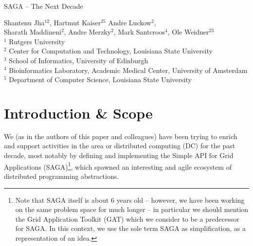 \documentclass{article}
\newcommand{\I}[1]{\textit{#1}}
\begin{document}
\begin{center}
 {\Large SAGA -- The Next Decade}
\end{center}

{
 {
  \centering
  Shantenu Jha$^{12}$,
  Hartmut Kaiser$^{25}$
  Andre Luckow$^{2}$,\\
  Sharath Maddineni$^{2}$,
  Andre Merzky$^{2}$,
  Mark Santcroos$^{4}$,
  Ole Weidner$^{23}$
  \\[0.4em]
  }
 \noindent
 \tiny
 $^1$ Rutgers University\\[-1.0em]
 $^2$ Center for Computation and Technology, Louisiana State University\\[-1.0em]
 $^3$ School of Informatics, University of Edinburgh \\[-1.0em]
 $^4$ Bioinformatics Laboratory, Academic Medical Center, University of Amsterdam\\[-1.0em]
 $^5$ Department of Computer Science, Louisiana State University\\[-1.0em]
}

\begin{abstract}

  
  The SAGA Project (as described below) has grown over time and
  evolved with \I{`the infrastructure'}. In this paper, we provide
  a retrospective (an analysis of where we are, and why), as well as
  a forward looking evolution and growth trajectory for our project.
  The purpose of this paper is to place SAGA in the past and future
  evolution of computing infrastructures, but also, to help us to
  consolidate the SAGA Project.

\end{abstract}


\section{Introduction \& Scope }
\label{sec:intro}

We (as in the authors of this paper and colleagues) have been trying
to enrich and support activities in the area or distributed computing
(DC) for the past decade, most notably by defining and implementing
the Simple API for Grid Applications (SAGA)\footnote{Note that SAGA
itself is about 6 years old -- however, we have been working on the
same problem space for much longer -- in particular we should mention
the Grid Application Toolkit (GAT) which we consider to be
a predecessor for SAGA.  In this context, we use the sole term SAGA as
simplification, as a representation of an idea.}, which spawned an
interesting and agile ecosystem of distributed programming
abstractions.
 
\end{document}

